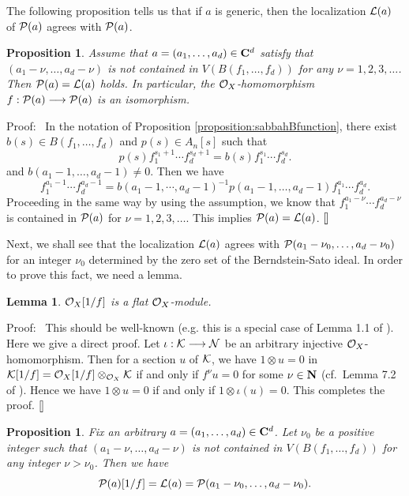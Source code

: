 \documentclass[12pt]{article}
\def\C{{\bf C}}
\def\N{ {\bf N} }
\def\V{ V }
\def\Ksc{ {\cal K} }
\def\Lsc{ {\cal L} }
\def\Nsc{ {\cal N} }
\def\Osc{ {\cal O} }
\def\Psc{ {\cal P} }
\newenvironment{proof}{\par\noindent Proof:\ }{${\tt [}\kern-0.2mm{\tt ]}$}
\newtheorem{lemma}[theorem]{Lemma}
\newtheorem{proposition}[theorem]{Proposition}
\begin{document}
The following proposition tells us that
if $a$ is generic, then the localization $\Lsc(a)$ of $\Psc(a)$
agrees with $\Psc(a)$.

\begin{proposition}  \label{proposition:generic}
Assume that $a = (a_1,\dots,a_d) \in \C^d$ satisfy that 
$(a_1-\nu,\dots,a_d-\nu)$ is not contained in $\V(B(f_1,\dots,f_d))$ 
for any $\nu = 1,2,3,\dots$.
Then $\Psc(a) = \Lsc(a)$ holds.
In particular, the $\Osc_X$-homomorphism 
$f : \Psc(a) \longrightarrow \Psc(a)$ is an isomorphism.	
\end{proposition}

\begin{proof}
In the notation of Proposition \ref{proposition:sabbahBfunction}, there exist
$b(s)\in B(f_1,\dots,f_d)$ and $p(s)\in A_n[s]$ such that
$$
p(s)f_1^{s_1+1}\cdots f_d^{s_d+1} = b(s)f_1^{s_1}\cdots f_d^{s_d}.
$$ 
and $b(a_1-1,\dots,a_d-1)\neq 0$. Then we have
$$
f_1^{a_1-1}\cdots f_d^{a_d-1} = b(a_1-1,\cdots,a_d-1)^{-1}
p(a_1-1,\dots,a_d-1)f_1^{a_1}\cdots f_d^{a_d}.
$$
Proceeding in the same way by using the assumption, we know that
$f_1^{a_1-\nu}\cdots f_d^{a_d-\nu}$ is contained in $\Psc(a)$ for 
$\nu = 1,2,3,\dots$.  This implies $\Psc(a) = \Lsc(a)$.
\end{proof}


Next, we shall see that the localization $\Lsc(a)$ agrees with 
$\Psc(a_1-\nu_0, \ldots, a_d-\nu_0)$ for an integer $\nu_0$
determined by the zero set of the Berndstein-Sato ideal.
In order to prove this fact, we need a lemma.

\begin{lemma}
$\Osc_X[1/f]$ is a flat $\Osc_X$-module.
\end{lemma}

\begin{proof}
This should be well-known (e.g. this is a special case of 
Lemma 1.1 of \cite{KK}).  Here we give a direct proof.
Let $\iota : \Ksc \longrightarrow \Nsc$ be an arbitrary injective 
$\Osc_X$-homomorphism.  
Then for a section $u$ of $\Ksc$, we have $1\otimes u = 0$ in 
$\Ksc[1/f] = \Osc_X[1/f]\otimes_{\Osc_X}\Ksc$ if and only if 
$f^\nu u = 0$ for some $\nu \in \N$ (cf.\ Lemma 7.2 of \cite{OakuAdvance}). 
Hence we have $1\otimes u = 0$ if and only if $1\otimes \iota(u) = 0$.  
This completes the proof.
\end{proof}


\begin{proposition}  \label{proposition:3.5}
Fix an arbitrary $a = (a_1,\dots,a_d) \in \C^d$.
Let $\nu_0$ be a positive integer such that 
$(a_1-\nu,\dots,a_d-\nu)$ is not contained in $\V(B(f_1,\dots,f_d))$ 
for any integer $\nu > \nu_0 $.  
Then we have
$$
\Psc(a)[1/f] = \Lsc(a) = \Psc(a_1-\nu_0,\dots,a_d-\nu_0). 
$$
\end{proposition}
\end{document}
